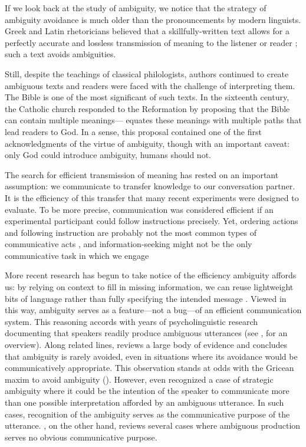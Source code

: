 \documentclass[10pt,a4paper]{article}
\newcommand{\gcs}[1]{\textcolor{blue}{[gcs: #1]}}
\begin{document}
If we look back at the study of ambiguity, we notice that the strategy of ambiguity avoidance is much older than the pronouncements by modern linguists. Greek and Latin rhetoricians believed that a skillfully-written text allows for a perfectly accurate and lossless transmission of meaning to the listener or reader \cite{ossarichardson2019}; such a text avoids ambiguities.

Still, despite the teachings of classical philologists, authors continued to  create ambiguous texts and readers were faced with the challenge of interpreting them. The Bible is one of the most significant of such texts. In the sixteenth century, the Catholic church responded to the Reformation by proposing that the Bible can contain multiple meanings--- equates these meanings with multiple paths that lead readers to God. In a sense, this proposal contained one of the first acknowledgments of the virtue of ambiguity, though with an important caveat: only God could introduce ambiguity, humans should not. 

The search for efficient transmission of meaning has rested on an important assumption: we communicate to transfer knowledge to our conversation partner. It is the efficiency of this transfer that many recent experiments were designed to evaluate. To be more precise, communication was considered efficient if an experimental participant could follow instructions precisely. Yet, ordering actions and following instruction are probably not  the most common types of communicative acts \cite{foppa1995mutual}, and information-seeking might not be the only communicative task in which we engage \cite{markova1995preface}

More recent research has begun to take notice of the efficiency ambiguity affords us: by relying on context to fill in missing information, we can reuse lightweight bits of language rather than fully specifying the intended message \cite{levinson2000,piantadosietal2012,wasow2015}. 
Viewed in this way, ambiguity serves as a feature---not a bug---of an efficient communication system.
This reasoning accords with years of psycholinguistic research documenting that speakers readily produce ambiguous utterances (see , for an overview). 
Along related lines,  reviews a large body of evidence and concludes that ambiguity is rarely avoided, even in situations where its avoidance would be communicatively appropriate.
This observation stands at odds with the Gricean maxim to avoid ambiguity ().
However, even \citeauthor{grice1975} recognized a case of strategic ambiguity where it could be the intention of the speaker to communicate more than one possible interpretation afforded by an ambiguous utterance. In such cases, recognition of the ambiguity serves as the communicative purpose of the utterance. , on the other hand, reviews several cases where ambiguous production serves no obvious communicative purpose.
\end{document}
